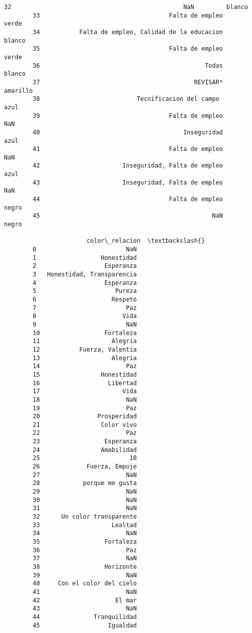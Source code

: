 \documentclass[11pt]{article}
\begin{document}
\begin{Verbatim}[commandchars=\\\{\}]
        32                                                NaN         blanco   
        33                                    Falta de empleo          verde   
        34           Falta de empleo, Calidad de la educacion         blanco   
        35                                    Falta de empleo          verde   
        36                                              Todas         blanco   
        37                                           REVISAR*       amarillo   
        38                           Tecnificacion del campo            azul   
        39                                    Falta de empleo            NaN   
        40                                        Inseguridad           azul   
        41                                    Falta de empleo            NaN   
        42                       Inseguridad, Falta de empleo           azul   
        43                       Inseguridad, Falta de empleo            NaN   
        44                                    Falta de empleo          negro   
        45                                                NaN          negro   
        
                       color\_relacion  \textbackslash{}
        0                         NaN   
        1                  Honestidad   
        2                   Esperanza   
        3   Honestidad, Transparencia   
        4                   Esperanza   
        5                      Pureza   
        6                     Respeto   
        7                         Paz   
        8                        Vida   
        9                         NaN   
        10                  Fortaleza   
        11                    Alegria   
        12           Fuerza, Valentia   
        13                    Alegria   
        14                        Paz   
        15                 Honestidad   
        16                   Libertad   
        17                       Vida   
        18                        NaN   
        19                        Paz   
        20                Prosperidad   
        21                 Color vivo   
        22                        Paz   
        23                  Esperanza   
        24                 Amabilidad   
        25                         10   
        26             Fuerza, Empuje   
        27                        NaN   
        28            porque me gusta   
        29                        NaN   
        30                        NaN   
        31                        NaN   
        32      Un color transparente   
        33                    Lealtad   
        34                        NaN   
        35                  Fortaleza   
        36                        Paz   
        37                        NaN   
        38                  Horizonte   
        39                        NaN   
        40     Con el color del cielo   
        41                        NaN   
        42                     El mar   
        43                        NaN   
        44               Tranquilidad   
        45                   Igualdad   
        

\end{Verbatim}
\end{document}
